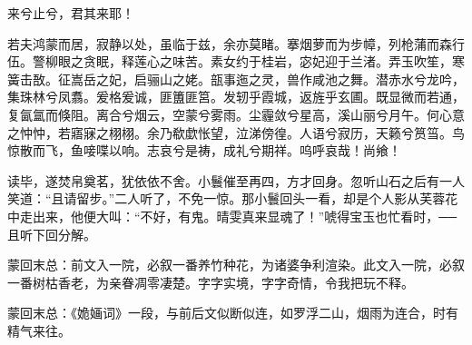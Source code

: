 \begin{qute2sp}
\begin{poem}
        \begin{pl}来兮止兮，君其来耶！\end{pl}
    \end{poem}

    \begin{parag}
        若夫鸿蒙而居，寂静以处，虽临于兹，余亦莫睹。搴烟萝而为步幛，列枪蒲而森行伍。警柳眼之贪眠，释莲心之味苦。素女约于桂岩，宓妃迎于兰渚。弄玉吹笙，寒簧击敔。征嵩岳之妃，启骊山之姥。瓿事迤之灵，兽作咸池之舞。潜赤水兮龙吟，集珠林兮凤翥。爰格爰诚，匪簠匪筥。发轫乎霞城，返旌乎玄圃。既显微而若通，复氤氲而倏阻。离合兮烟云，空蒙兮雾雨。尘霾敛兮星高，溪山丽兮月午。何心意之忡忡，若寤寐之栩栩。余乃欷歔怅望，泣涕傍徨。人语兮寂历，天籁兮筼筜。鸟惊散而飞，鱼唼喋以响。志哀兮是祷，成礼兮期祥。呜呼哀哉！尚飨！
    \end{parag}

\end{qute2sp}

\begin{parag}
    读毕，遂焚帛奠茗，犹依依不舍。小鬟催至再四，方才回身。忽听山石之后有一人笑道：“且请留步。”二人听了，不免一惊。那小鬟回头一看，却是个人影从芙蓉花中走出来，他便大叫：“不好，有鬼。晴雯真来显魂了！”唬得宝玉也忙看时，──且听下回分解。
\end{parag}


\begin{parag}
    \begin{note}蒙回末总：前文入一院，必叙一番养竹种花，为诸婆争利渲染。此文入一院，必叙一番树枯香老，为亲眷凋零凄楚。字字实境，字字奇情，令我把玩不释。\end{note}
\end{parag}


\begin{parag}
    \begin{note}蒙回末总：《姽婳词》一段，与前后文似断似连，如罗浮二山，烟雨为连合，时有精气来往。\end{note}
\end{parag}
